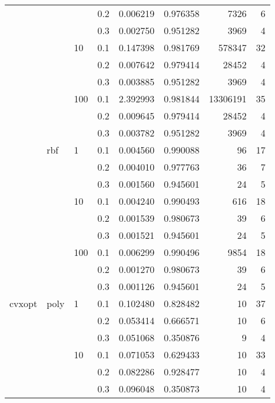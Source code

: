 \begin{table}[H]
\begin{tabular}{llllrrrr}
       &     &     & 0.2 &     0.006219 &  0.976358 &      7326 &     6 \\
       &     &     & 0.3 &     0.002750 &  0.951282 &      3969 &     4 \\
       &     & 10  & 0.1 &     0.147398 &  0.981769 &    578347 &    32 \\
       &     &     & 0.2 &     0.007642 &  0.979414 &     28452 &     4 \\
       &     &     & 0.3 &     0.003885 &  0.951282 &      3969 &     4 \\
       &     & 100 & 0.1 &     2.392993 &  0.981844 &  13306191 &    35 \\
       &     &     & 0.2 &     0.009645 &  0.979414 &     28452 &     4 \\
       &     &     & 0.3 &     0.003782 &  0.951282 &      3969 &     4 \\
       & rbf & 1   & 0.1 &     0.004560 &  0.990088 &        96 &    17 \\
       &     &     & 0.2 &     0.004010 &  0.977763 &        36 &     7 \\
       &     &     & 0.3 &     0.001560 &  0.945601 &        24 &     5 \\
       &     & 10  & 0.1 &     0.004240 &  0.990493 &       616 &    18 \\
       &     &     & 0.2 &     0.001539 &  0.980673 &        39 &     6 \\
       &     &     & 0.3 &     0.001521 &  0.945601 &        24 &     5 \\
       &     & 100 & 0.1 &     0.006299 &  0.990496 &      9854 &    18 \\
       &     &     & 0.2 &     0.001270 &  0.980673 &        39 &     6 \\
       &     &     & 0.3 &     0.001126 &  0.945601 &        24 &     5 \\
cvxopt & poly & 1   & 0.1 &     0.102480 &  0.828482 &        10 &    37 \\
       &     &     & 0.2 &     0.053414 &  0.666571 &        10 &     6 \\
       &     &     & 0.3 &     0.051068 &  0.350876 &         9 &     4 \\
       &     & 10  & 0.1 &     0.071053 &  0.629433 &        10 &    33 \\
       &     &     & 0.2 &     0.082286 &  0.928477 &        10 &     4 \\
       &     &     & 0.3 &     0.096048 &  0.350873 &        10 &     4 \\

\end{tabular}
\end{table}
